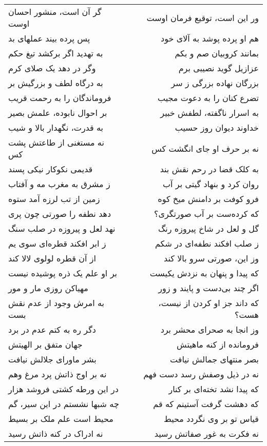 \begin{center}
\begin{longtable}{l p{0.5cm} r}
گر آن است، منشور احسان اوست
&&
ور این است، توقیع فرمان اوست
\\
پس پرده بیند عملهای بد
&&
هم او پرده پوشد به آلای خود
\\
به تهدید اگر برکشد تیغ حکم
&&
بمانند کروبیان صم و بکم
\\
وگر در دهد یک صلای کرم
&&
عزازیل گوید نصیبی برم
\\
به درگاه لطف و بزرگیش بر
&&
بزرگان نهاده بزرگی ز سر
\\
فروماندگان را به رحمت قریب
&&
تضرع کنان را به دعوت مجیب
\\
بر احوال نابوده، علمش بصیر
&&
به اسرار ناگفته، لطفش خبیر
\\
به قدرت، نگهدار بالا و شیب
&&
خداوند دیوان روز حسیب
\\
نه مستغنی از طاعتش پشت کس
&&
نه بر حرف او جای انگشت کس
\\
قدیمی نکوکار نیکی پسند
&&
به کلک قضا در رحم نقش بند
\\
ز مشرق به مغرب مه و آفتاب
&&
روان کرد و بنهاد گیتی بر آب
\\
زمین از تب لرزه آمد ستوه
&&
فرو کوفت بر دامنش میخ کوه
\\
دهد نطفه را صورتی چون پری
&&
که کرده‌ست بر آب صورتگری؟
\\
نهد لعل و پیروزه در صلب سنگ
&&
گل و لعل در شاخ پیروزه رنگ
\\
ز ابر افکند قطره‌ای سوی یم
&&
ز صلب افکند نطفه‌ای در شکم
\\
از آن قطره لولوی لالا کند
&&
وز این، صورتی سرو بالا کند
\\
بر او علم یک ذره پوشیده نیست
&&
که پیدا و پنهان به نزدش یکیست
\\
مهیاکن روزی مار و مور
&&
اگر چند بی‌دست و پایند و زور
\\
به امرش وجود از عدم نقش بست
&&
که داند جز او کردن از نیست، هست؟
\\
دگر ره به کتم عدم در برد
&&
وز انجا به صحرای محشر برد
\\
جهان متفق بر الهیتش
&&
فرومانده از کنه ماهیتش
\\
بشر ماورای جلالش نیافت
&&
بصر منتهای جمالش نیافت
\\
نه بر اوج ذاتش پرد مرغ وهم
&&
نه در ذیل وصفش رسد دست فهم
\\
در این ورطه کشتی فروشد هزار
&&
که پیدا نشد تخته‌ای بر کنار
\\
چه شبها نشستم در این سیر، گم
&&
که دهشت گرفت آستینم که قم
\\
محیط است علم ملک بر بسیط
&&
قیاس تو بر وی نگردد محیط
\\
نه ادراک در کنه ذاتش رسید
&&
نه فکرت به غور صفاتش رسید

\end{longtable}
\end{center}
